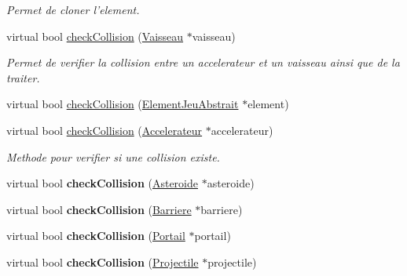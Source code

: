 \begin{DoxyCompactItemize}
\begin{DoxyCompactList}\small\item\em Permet de cloner l'element. \end{DoxyCompactList}\item 
\hypertarget{group__inf2990_gadae7daa610394fcc68cdfc663e464595}{virtual bool \hyperlink{group__inf2990_gadae7daa610394fcc68cdfc663e464595}{check\-Collision} (\hyperlink{class_vaisseau}{Vaisseau} $\ast$vaisseau)}\label{group__inf2990_gadae7daa610394fcc68cdfc663e464595}

\begin{DoxyCompactList}\small\item\em Permet de verifier la collision entre un accelerateur et un vaisseau ainsi que de la traiter. \end{DoxyCompactList}\item 
virtual bool \hyperlink{group__inf2990_ga5a2f46d23dac6e1999aaf918609c58fa}{check\-Collision} (\hyperlink{class_element_jeu_abstrait}{Element\-Jeu\-Abstrait} $\ast$element)
\item 
\hypertarget{class_accelerateur_a508a92e1d984eeae57f1bbdd84c84322}{virtual bool \hyperlink{class_accelerateur_a508a92e1d984eeae57f1bbdd84c84322}{check\-Collision} (\hyperlink{class_accelerateur}{Accelerateur} $\ast$accelerateur)}\label{class_accelerateur_a508a92e1d984eeae57f1bbdd84c84322}

\begin{DoxyCompactList}\small\item\em Methode pour verifier si une collision existe. \end{DoxyCompactList}\item 
\hypertarget{class_accelerateur_aa85ee233f8bc86cf6c826acc0580e0a2}{virtual bool {\bfseries check\-Collision} (\hyperlink{class_asteroide}{Asteroide} $\ast$asteroide)}\label{class_accelerateur_aa85ee233f8bc86cf6c826acc0580e0a2}

\item 
\hypertarget{class_accelerateur_a869783e0782c83f7eea473b618b14220}{virtual bool {\bfseries check\-Collision} (\hyperlink{class_barriere}{Barriere} $\ast$barriere)}\label{class_accelerateur_a869783e0782c83f7eea473b618b14220}

\item 
\hypertarget{class_accelerateur_ab61bf9baed0ba9963341ca3d8fbf1c60}{virtual bool {\bfseries check\-Collision} (\hyperlink{class_portail}{Portail} $\ast$portail)}\label{class_accelerateur_ab61bf9baed0ba9963341ca3d8fbf1c60}

\item 
\hypertarget{class_accelerateur_ac7e350f65c76b6d5afdb3f42212e32f5}{virtual bool {\bfseries check\-Collision} (\hyperlink{class_projectile}{Projectile} $\ast$projectile)}\label{class_accelerateur_ac7e350f65c76b6d5afdb3f42212e32f5}


\end{DoxyCompactItemize}
